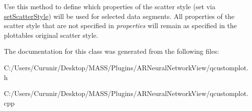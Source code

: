 Use this method to define which properties of the scatter style (set via \hyperlink{class_q_c_p_selection_decorator_ab403a613289714ff4fd4a0c0371ab116}{set\+Scatter\+Style}) will be used for selected data segments. All properties of the scatter style that are not specified in {\itshape properties} will remain as specified in the plottable\textquotesingle{}s original scatter style. 

The documentation for this class was generated from the following files\+:\begin{DoxyCompactItemize}
\item 
C\+:/\+Users/\+Curunir/\+Desktop/\+M\+A\+S\+S/\+Plugins/\+A\+R\+Neural\+Network\+View/qcustomplot.\+h\item 
C\+:/\+Users/\+Curunir/\+Desktop/\+M\+A\+S\+S/\+Plugins/\+A\+R\+Neural\+Network\+View/qcustomplot.\+cpp\end{DoxyCompactItemize}
